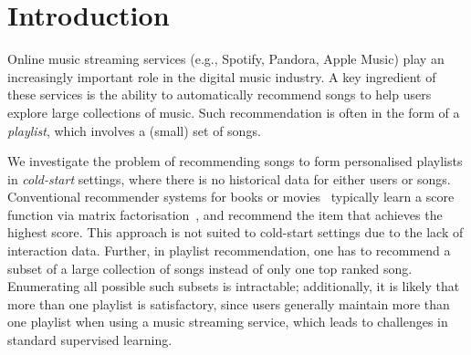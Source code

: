 
\section{Introduction}
\label{sec:intro}
Online music streaming services (e.g., Spotify, Pandora, Apple Music) %
play an increasingly important role in the digital music industry.
A key ingredient of these services is the ability to automatically recommend songs to help users explore large collections of music.
Such recommendation is often in the form of a \emph{playlist}, 
which involves a (small) set of songs.

We investigate the problem of recommending songs to form personalised playlists 
in \emph{cold-start} settings,
where there is no historical data for either users or songs.
%
Conventional recommender systems for books or movies~\citep{Sarwar:2001,Netflix}
typically learn a score function via matrix factorisation~\citep{Koren:2009},
and recommend the item that achieves the highest score.
This approach is not suited to %
cold-start settings
due to the lack of interaction data. %
%
Further, in playlist recommendation,
one has to recommend a subset of a large collection of songs instead of only one top ranked song.
Enumerating all possible such subsets is intractable;
additionally,
it is likely that more than one playlist is satisfactory, since
users generally maintain more than one playlist when using a music streaming service,
which leads to challenges in standard supervised learning.




